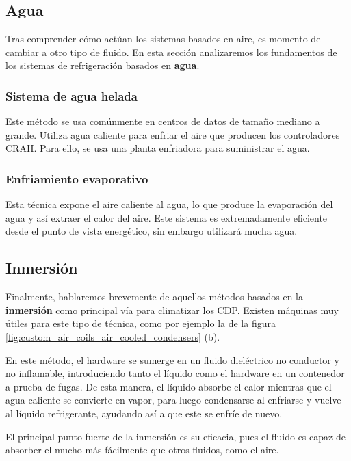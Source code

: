 \subsection{Agua} \label{awa}

Tras comprender cómo actúan los sistemas basados en aire, es momento de cambiar a otro tipo de fluido. En esta sección analizaremos los fundamentos de los sistemas de refrigeración basados en \textbf{agua}.


\subsubsection{Sistema de agua helada}

Este método se usa comúnmente en centros de datos de tamaño mediano a grande. Utiliza agua caliente para enfriar el aire que producen los controladores CRAH. Para ello, se usa una planta enfriadora para suministrar el agua.


\subsubsection{Enfriamiento evaporativo}

Esta técnica expone el aire caliente al agua, lo que produce la evaporación del agua y así extraer el calor del aire. Este sistema es extremadamente eficiente desde el punto de vista energético, sin embargo utilizará mucha agua.



\subsection{Inmersión} \label{inmersion}

Finalmente, hablaremos brevemente de aquellos métodos basados en la \textbf{inmersión} como principal vía para climatizar los CDP. Existen máquinas muy útiles para este tipo de técnica, como por ejemplo la de la figura \eqref{fig:custom_air_coils_air_cooled_condensers} (b).

En este método, el hardware se sumerge en un fluido dieléctrico no conductor y no inflamable, introduciendo tanto el líquido como el hardware en un contenedor a prueba de fugas. De esta manera, el líquido absorbe el calor mientras que el agua caliente se convierte en vapor, para luego condensarse al enfriarse y vuelve al líquido refrigerante, ayudando así a que este se enfríe de nuevo.

El principal punto fuerte de la inmersión es su eficacia, pues el fluido es capaz de absorber el mucho más fácilmente que otros fluidos, como el aire.



